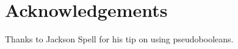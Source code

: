 
\section{Acknowledgements} 
\label{sec:ack} 

Thanks to Jackson Spell for his tip on using pseudobooleans.

